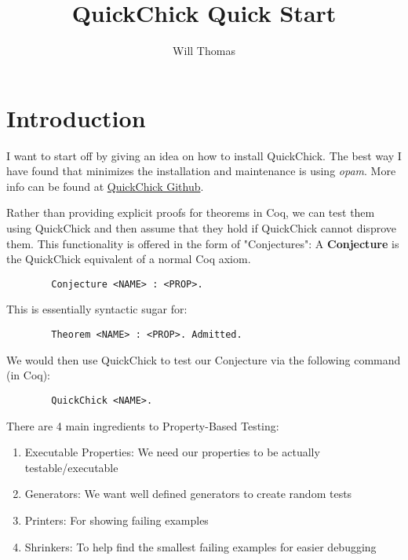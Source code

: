 \documentclass{article}
\title{\textbf{QuickChick Quick Start}}
\author{Will Thomas}
\begin{document}
    \maketitle

    \section{Introduction}
    I want to start off by giving an idea on how to install QuickChick. The best way I have found that minimizes the installation and maintenance is using \emph{opam}. More info can be found at \href{https://github.com/QuickChick/QuickChick#installation}{QuickChick Github}.

    Rather than providing explicit proofs for theorems in Coq, we can test them using QuickChick and then assume that they hold if QuickChick cannot disprove them. This functionality is offered in the form of "Conjectures": 
    A \textbf{Conjecture} is the QuickChick equivalent of a normal Coq axiom.
    \begin{verbatim}
        Conjecture <NAME> : <PROP>.
    \end{verbatim}
    This is essentially syntactic sugar for:
    \begin{verbatim}
        Theorem <NAME> : <PROP>. Admitted.
    \end{verbatim}
    We would then use QuickChick to test our Conjecture via the following command (in Coq):
    \begin{verbatim}
        QuickChick <NAME>.
    \end{verbatim}
    There are 4 main ingredients to Property-Based Testing:
    \begin{enumerate}
        \item Executable Properties: We need our properties to be actually testable/executable
        \item Generators: We want well defined generators to create random tests
        \item Printers: For showing failing examples
        \item Shrinkers: To help find the smallest failing examples for easier debugging
    \end{enumerate}
\end{document}
